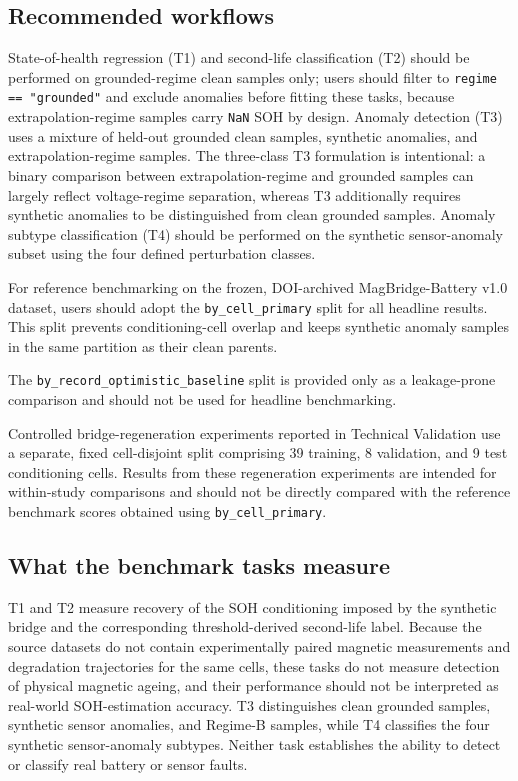 \documentclass[11pt]{article}
\begin{document}
\subsection*{Recommended workflows}

State-of-health regression (T1) and second-life classification (T2) should
be performed on grounded-regime clean samples only; users should filter to
\texttt{regime == "grounded"} and exclude anomalies before fitting these
tasks, because extrapolation-regime samples carry \texttt{NaN} SOH by
design. Anomaly detection (T3) uses a mixture of held-out grounded clean
samples, synthetic anomalies, and extrapolation-regime samples. The three-class
T3 formulation is intentional: a binary comparison between extrapolation-regime
and grounded samples can largely reflect voltage-regime separation, whereas
T3 additionally requires synthetic anomalies to be distinguished from clean
grounded samples. Anomaly subtype classification (T4) should be performed on
the synthetic sensor-anomaly subset using the four defined perturbation
classes.

For reference benchmarking on the frozen, DOI-archived
MagBridge-Battery v1.0 dataset, users should adopt the
\texttt{by\_cell\_primary} split for all headline
results. This split prevents conditioning-cell overlap
and keeps synthetic anomaly samples in the same
partition as their clean parents.

The \texttt{by\_record\_optimistic\_baseline} split
is provided only as a leakage-prone comparison and
should not be used for headline benchmarking.

Controlled bridge-regeneration experiments reported
in Technical Validation use a separate, fixed
cell-disjoint split comprising 39 training, 8 validation,
and 9 test conditioning cells. Results from these
regeneration experiments are intended for within-study
comparisons and should not be directly compared with
the reference benchmark scores obtained using
\texttt{by\_cell\_primary}.


\subsection*{What the benchmark tasks measure}

T1 and T2 measure recovery of the SOH conditioning imposed by the synthetic bridge and the corresponding threshold-derived second-life label. Because the source datasets do not contain experimentally paired magnetic measurements and degradation trajectories for the same cells, these tasks do not measure detection of physical magnetic ageing, and their performance should not be interpreted as real-world SOH-estimation accuracy. 
T3 distinguishes clean grounded samples, synthetic sensor
anomalies, and Regime-B samples, while T4 classifies
the four synthetic sensor-anomaly subtypes. Neither task
establishes the ability to detect or classify real battery
or sensor faults.
\end{document}
